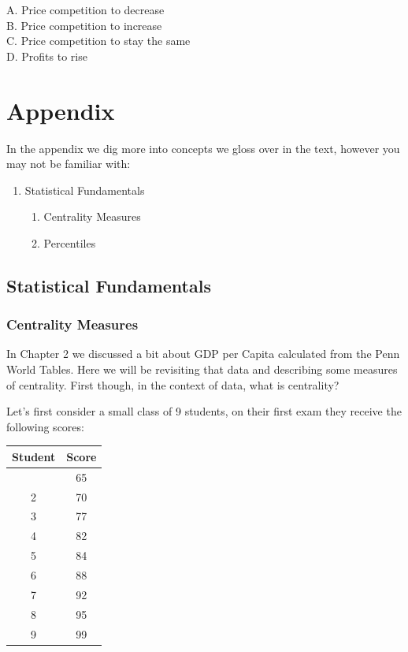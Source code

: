 \documentclass[
]{book}
\providecommand{\tightlist}{%
  \setlength{\itemsep}{0pt}\setlength{\parskip}{0pt}}
\begin{document}
\begin{enumerate}
  A. Price competition to decrease\\
  B. Price competition to increase\\
  C. Price competition to stay the same\\
  D. Profits to rise
\end{enumerate}

\hypertarget{appendix}{%
\chapter{Appendix}\label{appendix}}

In the appendix we dig more into concepts we gloss over in the text, however you may not be familiar with:

\begin{enumerate}
\def\labelenumi{\arabic{enumi}.}
\tightlist
\item
  Statistical Fundamentals

  \begin{enumerate}
  \def\labelenumii{\alph{enumii}.}
  \tightlist
  \item
    Centrality Measures
  \item
    Percentiles
  \end{enumerate}
\end{enumerate}

\hypertarget{statistical-fundamentals}{%
\section{Statistical Fundamentals}\label{statistical-fundamentals}}

\hypertarget{centrality-measures}{%
\subsection{Centrality Measures}\label{centrality-measures}}

In Chapter 2 we discussed a bit about GDP per Capita calculated from the Penn World Tables. Here we will be revisiting that data and describing some measures of centrality. First though, in the context of data, what is centrality?

Let's first consider a small class of 9 students, on their first exam they receive the following scores:

\begin{longtable}[]{@{}cc@{}}
\toprule\noalign{}
Student & Score \\
\midrule\noalign{}
\endhead
\bottomrule\noalign{}
\endlastfoot
1 & 65 \\
2 & 70 \\
3 & 77 \\
4 & 82 \\
5 & 84 \\
6 & 88 \\
7 & 92 \\
8 & 95 \\
9 & 99 \\
\end{longtable}
\end{document}
